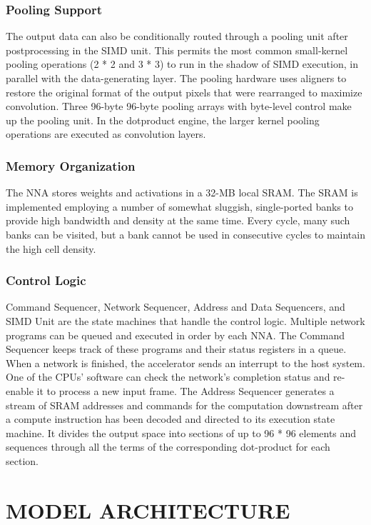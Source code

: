 \documentclass[letterpaper, 10 pt, conference]{ieeeconf}  %
\begin{document}
\subsubsection{Pooling Support}
The output data can also be conditionally routed through a pooling unit after postprocessing in the SIMD unit. This permits the most common small-kernel pooling operations (2 * 2 and 3 * 3) to run in the shadow of SIMD execution, in parallel with the data-generating layer. The pooling hardware uses aligners to restore the original format of the output pixels that were rearranged to maximize convolution. Three 96-byte 96-byte pooling arrays with byte-level control make up the pooling unit. In the dotproduct engine, the larger kernel pooling operations are executed as convolution layers.

\subsubsection{Memory Organization}

The NNA stores weights and activations in a 32-MB local SRAM. The SRAM is implemented employing a number of somewhat sluggish, single-ported banks to provide high bandwidth and density at the same time. Every cycle, many such banks can be visited, but a bank cannot be used in consecutive cycles to maintain the high cell density.

\subsubsection{Control Logic}
Command Sequencer, Network Sequencer, Address and Data Sequencers, and SIMD Unit are the state machines that handle the control logic. Multiple network programs can be queued and executed in order by each NNA. The Command Sequencer keeps track of these programs and their status registers in a queue. When a network is finished, the accelerator sends an interrupt to the host system. One of the CPUs' software can check the network's completion status and re-enable it to process a new input frame. The Address Sequencer generates a stream of SRAM addresses and commands for the computation downstream after a compute instruction has been decoded and directed to its execution state machine. It divides the output space into sections of up to 96 * 96 elements and sequences through all the terms of the corresponding dot-product for each section.


\section{MODEL ARCHITECTURE}
\end{document}
